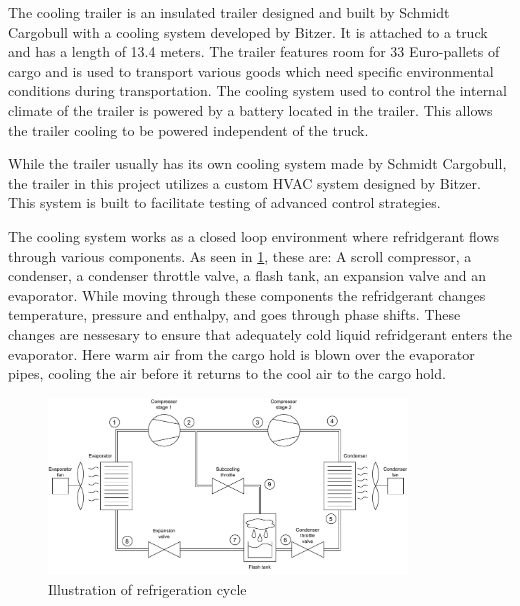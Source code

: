 The cooling trailer is an insulated trailer designed and built by Schmidt Cargobull with a cooling system developed by Bitzer. It is attached to a truck and has a length of 13.4 meters. The trailer features room for 33 Euro-pallets of cargo and is used to transport various goods which need specific environmental conditions during transportation. The cooling system used to control the internal climate of the trailer is powered by a battery located in the trailer. This allows the trailer cooling to be powered independent of the truck.

While the trailer usually has its own cooling system made by Schmidt Cargobull, the trailer in this project utilizes a custom HVAC system designed by Bitzer. This system is built to facilitate testing of advanced control strategies.

The cooling system works as a closed loop environment where refridgerant flows through various components. As seen in \cref{fig:HVAC_Diagram}, these are: A scroll compressor, a condenser, a condenser throttle valve, a flash tank, an expansion valve and an evaporator. While moving through these components the refridgerant changes temperature, pressure and enthalpy, and goes through phase shifts. These changes are nessesary to ensure that adequately cold liquid refridgerant enters the evaporator. Here warm air from the cargo hold is blown over the evaporator pipes, cooling the air before it returns to the cool air to the cargo hold. 


\begin{figure}[h!]
	\centering
	\includegraphics[width=0.85\textwidth]{Graphics/HVAC_Diagram_Fans.pdf}
	\caption{Illustration of refrigeration cycle}
	\label{fig:HVAC_Diagram}
\end{figure}


